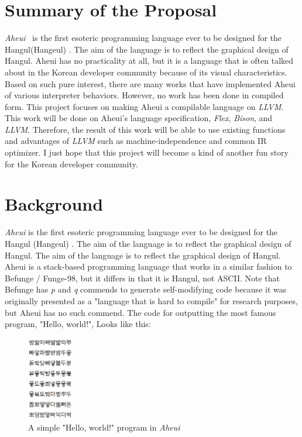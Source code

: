 \section*{Summary of the Proposal}

\textit{Aheui}~\cite{aheui} is the first esoteric programming language ever to be designed for the Hangul(Hangeul) . The aim of the language is to reflect the graphical design of Hangul. Aheui has no practicality at all, but it is a language that is often talked about in the Korean developer community because of its visual characteristics. Based on such pure interest, there are many works that have implemented Aheui of various interpreter behaviors. However, no work has been done in compiled form. This project focuses on making Aheui a compilable language on \textit{LLVM}. This work will be done on Aheui's language specification, \textit{Flex}, \textit{Bison}, and \textit{LLVM}. Therefore, the result of this work will be able to use existing functions and advantages of \textit{LLVM} such as machine-independence and common IR optimizer. I just hope that this project will become a kind of another fun story for the Korean developer community.

\section*{Background}

\textit{Aheui} is the first esoteric programming language ever to be designed for the Hangul (Hangeul) . The aim of the language is to reflect the graphical design of Hangul. The aim of the language is to reflect the graphical design of Hangul. Aheui is a stack-based programming language that works in a similar fashion to Befunge / Funge-98, but it differs in that it is Hangul, not ASCII. Note that Befunge has \textit{p} and \textit{q} commends to generate self-modifying code because it was originally presented as a "language that is hard to compile" for research purposes, but Aheui has no such commend. The code for outputting the most famous program, "Hello, world!", Looks like this:
\\
\begin{figure}[ht!]
\centering
\includegraphics[width=20mm]{helloworld.png}
\caption{A simple "Hello, world!" program in \textit{Aheui}\label{overflow}}
\end{figure}

